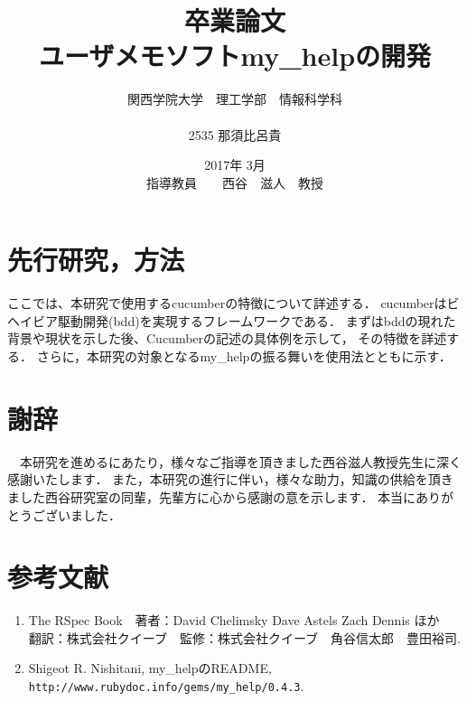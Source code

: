 \documentclass[12pt,a4paper]{jsarticle}
\begin{document}
\title{卒業論文\\
\vspace{4cm} ユーザメモソフトmy\_helpの開発}
\author{ 関西学院大学　理工学部　情報科学科\\\\2535 那須比呂貴}
\date{\vspace{3cm} 2017年  3月\\
\vspace{3cm} 指導教員　　西谷　滋人　教授}
\maketitle
\setcounter{tocdepth}{4}
\tableofcontents

\tableofcontents


\section{先行研究，方法}
ここでは、本研究で使用するcucumberの特徴について詳述する．
cucumberはビヘイビア駆動開発(bdd)を実現するフレームワークである．
まずはbddの現れた背景や現状を示した後、Cucumberの記述の具体例を示して，
その特徴を詳述する．
さらに，本研究の対象となるmy\_helpの振る舞いを使用法とともに示す．







\section{謝辞}
　本研究を進めるにあたり，様々なご指導を頂きました西谷滋人教授先生に深く感謝いたします．
また，本研究の進行に伴い，様々な助力，知識の供給を頂きました西谷研究室の同輩，先輩方に心から感謝の意を示します．
本当にありがとうございました．

\section{参考文献}
\begin{enumerate}
\item The RSpec Book　著者：David Chelimsky Dave Astels Zach Dennis ほか　翻訳：株式会社クイーブ　監修：株式会社クイーブ　角谷信太郎　豊田裕司.
\item Shigeot R. Nishitani, my\_helpのREADME, \verb|http://www.rubydoc.info/gems/my_help/0.4.3|.
\end{enumerate}
\end{document}
